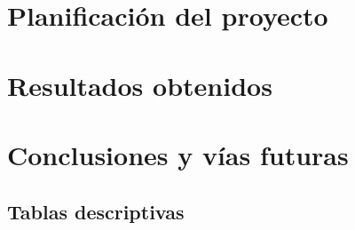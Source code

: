 \documentclass[oneside,openright,titlepage,numbers=noenddot,openany,headinclude,footinclude=true,
cleardoublepage=empty,abstractoff,BCOR=5mm,paper=a4,fontsize=12pt,main=spanish]{scrreprt}
\begin{document}
\part{Planificación del proyecto}\label{sec:parteIV}




\part{Resultados obtenidos}\label{sec:parteV}






\part{Conclusiones y vías futuras}\label{sec:parteVI}




\begin{appendices}
\chapter{Tablas descriptivas}

\end{appendices}



{}
 
\end{document}
